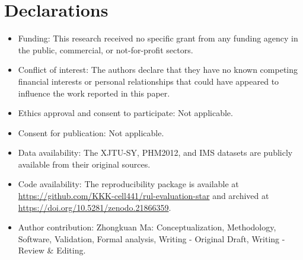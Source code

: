 \documentclass[pdflatex,sn-mathphys-num]{sn-jnl}
\begin{document}
\section*{Declarations}
\begin{itemize}
\item Funding: This research received no specific grant from any funding agency in the public, commercial, or not-for-profit sectors.
\item Conflict of interest: The authors declare that they have no known competing financial interests or personal relationships that could have appeared to influence the work reported in this paper.
\item Ethics approval and consent to participate: Not applicable.
\item Consent for publication: Not applicable.
\item Data availability: The XJTU-SY, PHM2012, and IMS datasets are publicly available from their original sources.
\item Code availability: The reproducibility package is available at \url{https://github.com/KKK-cell441/rul-evaluation-star} and archived at \url{https://doi.org/10.5281/zenodo.21866359}.
\item Author contribution: Zhongkuan Ma: Conceptualization, Methodology, Software, Validation, Formal analysis, Writing - Original Draft, Writing - Review \& Editing.
\end{itemize}
\end{document}
